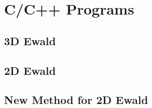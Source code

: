 \chapter{C/C++ Programs}
\label{AppendixB} %
\section{3D Ewald}

\section{2D Ewald}

\section{New Method for 2D Ewald}
